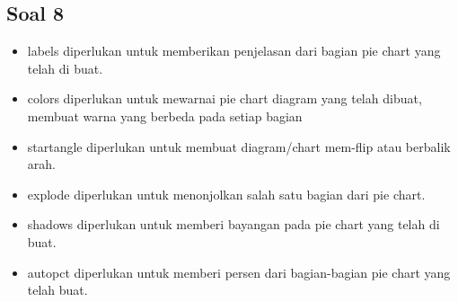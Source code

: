 	\subsection{Soal 8}
	\begin{itemize}
	\item labels diperlukan untuk memberikan penjelasan dari bagian pie chart yang telah di buat.
	\item colors diperlukan untuk mewarnai pie chart diagram yang telah dibuat, membuat warna yang 		   berbeda pada setiap bagian
	\item startangle diperlukan untuk membuat diagram/chart mem-flip atau berbalik arah.
	\item explode diperlukan untuk menonjolkan salah satu bagian dari pie chart.
	\item shadows diperlukan untuk memberi bayangan pada pie chart yang telah di buat.
	\item autopct diperlukan untuk memberi persen dari bagian-bagian pie chart yang telah buat.
	\end{itemize}

